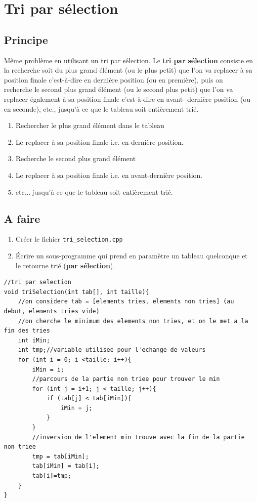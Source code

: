 \documentclass[french]{article}
\begin{document}
\section{Tri par sélection}

\subsection*{Principe}

Même problème en utilisant un tri par sélection. Le \textbf{tri par sélection} consiste en la recherche soit du plus grand élément (ou le plus petit) que l'on va replacer à sa position finale c'est-à-dire en dernière position (ou en première), puis on recherche le second plus grand élément (ou le second plus petit) que l'on va replacer également à sa position finale c'est-à-dire en avant- dernière position (ou en seconde), etc., jusqu'à ce que le tableau soit entièrement trié.
\begin{enumerate}
	\item Rechercher le plus grand élément dans le tableau
	\item Le replacer à sa position finale i.e. en dernière position.
	\item Recherche le second plus grand élément
	\item Le replacer à sa position finale i.e. en avant-dernière position.
	\item etc... jusqu'à ce que le tableau soit entièrement trié.
\end{enumerate} 
\subsection*{A faire}
\begin{enumerate}
	\item Créer le fichier \texttt{tri\_selection.cpp}
	\item Écrire un sous-programme qui prend en paramètre un tableau quelconque et le retourne trié (\textbf{par sélection}).
\end{enumerate}

\begin{lstlisting}[caption={Tri par selection}]
//tri par selection
void triSelection(int tab[], int taille){
    //on considere tab = [elements tries, elements non tries] (au debut, elements tries vide)
    //on cherche le minimum des elements non tries, et on le met a la fin des tries
    int iMin;
    int tmp;//variable utilisee pour l'echange de valeurs
    for (int i = 0; i <taille; i++){
        iMin = i;
        //parcours de la partie non triee pour trouver le min
        for (int j = i+1; j < taille; j++){
            if (tab[j] < tab[iMin]){
                iMin = j;
            }
        }
        //inversion de l'element min trouve avec la fin de la partie non triee
        tmp = tab[iMin];
        tab[iMin] = tab[i];
        tab[i]=tmp;
    }
}
\end{lstlisting}
\end{document}
